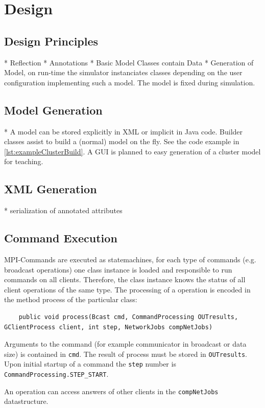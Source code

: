 \documentclass[
     11pt,         %
     a4paper,      %
     BCOR10mm,     %
     DIV14,        %
     liststotoc,   %
     bibtotoc,     %
     idxtotoc,     %
     parskip       %
     ]{scrreprt}   %
\begin{document}
\chapter{Design}

\section{Design Principles}
* Reflection
* Annotations
* Basic Model Classes contain Data
* Generation of Model, on run-time the simulator instanciates classes depending on the user configuration implementing such a model. The model is fixed during simulation.

\section{Model Generation}
* A model can be stored explicitly in XML or implicit in Java code.
Builder classes assist to build a (normal) model on the fly.
See the code example in \ref{lst:exampleClusterBuild}. 
A GUI is planned to easy generation of a cluster model for teaching.


\section{XML Generation}
* serialization of annotated attributes

\section{Command Execution}
MPI-Commands are executed as statemachines, for each type of commands (e.g. broadcast operations) one class instance is loaded and responsible to run commands on all clients. 
Therefore, the class instance knows the status of all client operations of the same type.
The processing of a operation is encoded in the method process of the particular class:
\begin{verbatim} 
	public void process(Bcast cmd, CommandProcessing OUTresults, GClientProcess client, int step, NetworkJobs compNetJobs)
\end{verbatim}
Arguments to the command (for example communicator in broadcast or data size) is contained in \texttt{cmd}.
The result of process must be stored in \texttt{OUTresults}.
Upon initial startup of a command the \texttt{step} number is \texttt{CommandProcessing.STEP_START}.

An operation can access answers of other clients in the \texttt{compNetJobs} datastructure.
\end{document}
